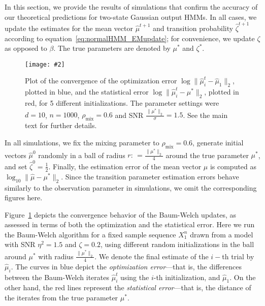 \documentclass[twoside,11pt]{article}
\newcommand{\widgraph}[2]{\texttt{[image: \#2]}}
\newcommand{\norm}[1]{\ensuremath{\|#1\|_2}}
\newcommand{\mixcoef}{\ensuremath{\rho_{\mathrm{mix}}}}
\newcommand{\paramobs}{\mu}
\newcommand{\trueparamobs}{\ensuremath{\paramobs^*}}
\newcommand{\paramtrans}{\beta}
\newcommand{\SNR}{\eta^2}
\newcommand{\defn}{: \, = }
\newcommand{\rad}{\ensuremath{r}}
\newcommand{\probpar}{\zeta}
\newcommand{\matprob}{\probpar}
\newcommand{\matprobhat}{\widehat{\matprob}}
\newcommand{\paramobshat}{\widehat{\paramobs}}
\begin{document}
In this section, we provide the results of simulations that confirm
the accuracy of our theoretical predictions for two-state Gaussian
output HMMs. In all cases, we update the estimates for the mean vector
$\paramobshat^{t+1}$ and transition probability $\hat{\matprob}^{t+1}$
according to equation~\eqref{eq:normalHMM_EMupdate}; for
convenience, we update $\zeta$ as opposed to $\paramtrans$. 
The true parameters are denoted by $\trueparamobs$ and
$\matprob^*$.
\begin{figure}[htbp]
  \begin{center}
\widgraph{0.5\textwidth}{images/OpStatErr_iteration_tofirst_Paper.pdf}
\end{center}
\caption{Plot of the convergence of the optimization error $\log
  \|\widehat{\paramobs}_i^t - \widehat{\paramobs}_1\|_2$,
  plotted in blue, and the statistical error
  $\log\|\widehat{\paramobs}_i^t - \trueparamobs\|_2$, plotted in red,
  for 5 different initializations.  The parameter settings were $d =
  10$, $n = 1000$, $\mixcoef = 0.6$ and SNR
  $\frac{\|\trueparamobs\|_2}{\sigma} = 1.5$.  See the main text for
  further details.}
\label{fig:it}
\end{figure}


In all simulations, we fix the mixing parameter to $\mixcoef =0.6$,
generate initial vectors $\paramobshat^0$ randomly in a ball of radius
$\rad \defn \frac{\|\trueparamobs\|_2}{4}$ around the true parameter
$\trueparamobs$, and set $\widehat{\zeta}^0 = \frac{1}{2}$.  Finally,
the estimation error of the mean vector $\paramobs$ is computed as
$\log_{10}\|\hat{\mu} - \trueparamobs\|_2$. Since the transition
parameter estimation errors behave similarly to the observation
parameter in simulations, we omit the corresponding figures here.


Figure~\ref{fig:it} depicts the convergence behavior of the Baum-Welch
updates, as assessed in terms of both the optimization and the
statistical error. Here we run the Baum-Welch algorithm for a fixed
sample sequence $X_1^n$ drawn from a model with SNR $\SNR = 1.5$ and
$\zeta = 0.2$, using different random initializations in the ball
around $\trueparamobs$ with radius $\frac{\norm{\trueparamobs}}{4}$.
We denote the final estimate of the $i-$th trial by
$\paramobshat_i$. The curves in blue depict the
\emph{optimization error}---that is, the differences between the
Baum-Welch iterates $\paramobshat_i^t$ using the $i$-th
initialization, and $\paramobshat_1$.  On the other hand, the
red lines represent the \emph{statistical error}---that is, the
distance of the iterates from the true parameter $\trueparamobs$.
\end{document}
